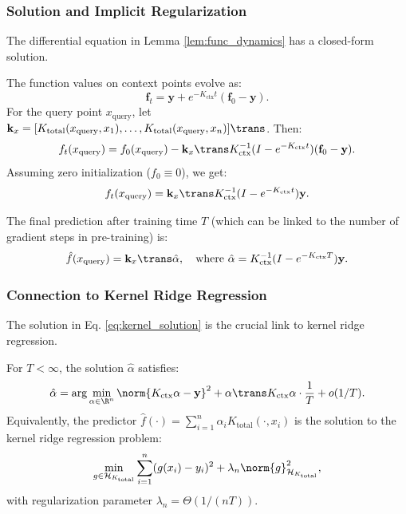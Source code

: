 	\subsubsection{Solution and Implicit Regularization}
	\label{subsubsec:solution}
	
	The differential equation in Lemma \ref{lem:func_dynamics} has a closed-form solution.
	
	\begin{proposition}
		\label{prop:solution}
		The function values on context points evolve as:
		\[
		\mathbf{f}_t = \mathbf{y} + e^{-K_{\text{ctx}} t} (\mathbf{f}_0 - \mathbf{y}).
		\]
		For the query point $x_{\text{query}}$, let $\mathbf{k}_x = [K_{\text{total}}(x_{\text{query}}, x_1), \dots, K_{\text{total}}(x_{\text{query}}, x_n)]\trans$. Then:
		\[
		f_t(x_{\text{query}}) = f_0(x_{\text{query}}) - \mathbf{k}_x\trans K_{\text{ctx}}^{-1} (I - e^{-K_{\text{ctx}} t}) (\mathbf{f}_0 - \mathbf{y}).
		\]
		Assuming zero initialization ($f_0 \equiv 0$), we get:
		\[
		f_t(x_{\text{query}}) = \mathbf{k}_x\trans K_{\text{ctx}}^{-1} (I - e^{-K_{\text{ctx}} t}) \mathbf{y}.
		\]
	\end{proposition}
	
	The final prediction after training time $T$ (which can be linked to the number of gradient steps in pre-training) is:
	\begin{equation}
		\hat{f}(x_{\text{query}}) = \mathbf{k}_x\trans \hat{\alpha}, \quad \text{where } \hat{\alpha} = K_{\text{ctx}}^{-1} (I - e^{-K_{\text{ctx}} T}) \mathbf{y}.
		\label{eq:kernel_solution}
	\end{equation}
	
	\subsubsection{Connection to Kernel Ridge Regression}
	\label{subsubsec:connection_krr}
	
	The solution in Eq. \eqref{eq:kernel_solution} is the crucial link to kernel ridge regression.
	
	\begin{lemma}
		\label{lem:early_stopping}
		For $T < \infty$, the solution $\hat{\alpha}$ satisfies:
		\[
		\hat{\alpha} = \arg\min_{\alpha \in \R^n} \norm{K_{\text{ctx}} \alpha - \mathbf{y}}^2 + \alpha\trans K_{\text{ctx}} \alpha \cdot \frac{1}{T} + o(1/T).
		\]
		Equivalently, the predictor $\hat{f}(\cdot) = \sum_{i=1}^n \alpha_i K_{\text{total}}(\cdot, x_i)$ is the solution to the kernel ridge regression problem:
		\[
		\min_{g \in \mathcal{H}_{K_{\text{total}}}} \sum_{i=1}^n (g(x_i) - y_i)^2 + \lambda_n \norm{g}_{\mathcal{H}_{K_{\text{total}}}}^2,
		\]
		with regularization parameter $\lambda_n = \Theta(1/(n T))$.
	\end{lemma}
	
